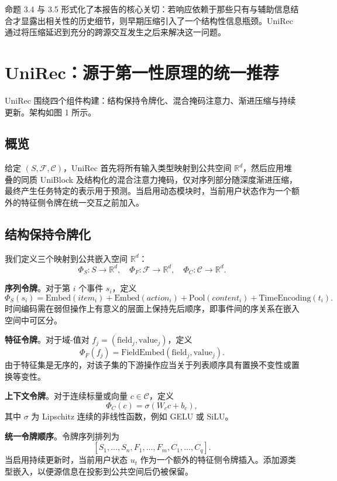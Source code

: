 \documentclass{article}
\begin{document}
命题 3.4 与 3.5 形式化了本报告的核心关切：若响应依赖于那些只有与辅助信息结合才显露出相关性的历史细节，则早期压缩引入了一个结构性信息瓶颈。UniRec 通过将压缩延迟到充分的跨源交互发生之后来解决这一问题。

\section{UniRec：源于第一性原理的统一推荐}

UniRec 围绕四个组件构建：结构保持令牌化、混合掩码注意力、渐进压缩与持续更新。架构如图 1 所示。

\subsection{概览}

给定 \((S,\mathcal{F},\mathcal{C})\)，UniRec 首先将所有输入类型映射到公共空间 \(\mathbb{R}^d\)，然后应用堆叠的同质 UniBlock 及结构化的混合注意力掩码，仅对序列部分随深度渐进压缩，最终产生任务特定的表示用于预测。当启用动态模块时，当前用户状态作为一个额外的特征侧令牌在统一交互之前加入。

\subsection{结构保持令牌化}

我们定义三个映射到公共嵌入空间 \(\mathbb{R}^d\)：
\[
\Phi_S: S \to \mathbb{R}^d,\quad \Phi_F: \mathcal{F} \to \mathbb{R}^d,\quad \Phi_C: \mathcal{C} \to \mathbb{R}^d.
\]

\textbf{序列令牌}。对于第 \(i\) 个事件 \(s_i\)，定义
\[
\Phi_S(s_i) = \mathrm{Embed}(item_i) + \mathrm{Embed}(action_i) + \mathrm{Pool}(content_i) + \mathrm{TimeEncoding}(t_i). \tag{4.1}
\]
时间编码需在弱但操作上有意义的层面上保持先后顺序，即事件间的序关系在嵌入空间中可区分。

\textbf{特征令牌}。对于域-值对 \(f_j = (\mathrm{field}_j, \mathrm{value}_j)\)，定义
\[
\Phi_F(f_j) = \mathrm{FieldEmbed}(\mathrm{field}_j, \mathrm{value}_j). \tag{4.2}
\]
由于特征集是无序的，对该子集的下游操作应当关于列表顺序具有置换不变性或置换等变性。

\textbf{上下文令牌}。对于连续标量或向量 \(c \in \mathcal{C}\)，定义
\[
\Phi_C(c) = \sigma(W_c c + b_c), \tag{4.3}
\]
其中 \(\sigma\) 为 Lipschitz 连续的非线性函数，例如 GELU 或 SiLU。

\textbf{统一令牌顺序}。令牌序列排列为
\[
[S_1,\ldots,S_n, F_1,\ldots,F_m, C_1,\ldots,C_q].
\]
当启用持续更新时，当前用户状态 \(u_t\) 作为一个额外的特征侧令牌插入。添加源类型嵌入，以便源信息在投影到公共空间后仍被保留。
\end{document}
